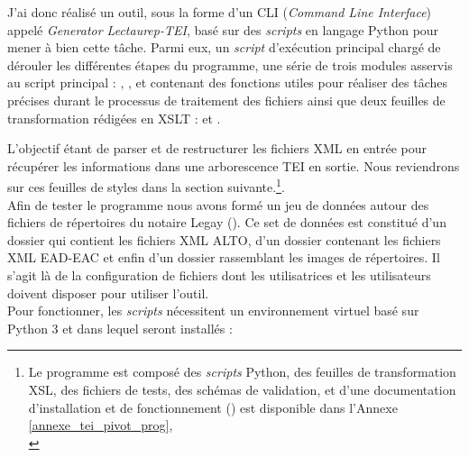 J'ai donc réalisé un outil, sous la forme d'un CLI (\textit{Command Line Interface}) appelé \textit{Generator Lectaurep-TEI}, basé sur des \textit{scripts} en langage Python pour mener à bien cette tâche. Parmi eux, un \textit{script} d'exécution principal  chargé de dérouler les différentes étapes du programme, une série de trois modules asservis au script principal : , , et  contenant des fonctions utiles pour réaliser des tâches précises durant le processus de traitement des fichiers ainsi que deux feuilles de transformation rédigées en XSLT :  et .

L'objectif étant de parser et de restructurer les fichiers XML en entrée pour récupérer les informations dans une arborescence TEI en sortie. Nous reviendrons sur ces feuilles de styles dans la section suivante.\footnote{Le programme est composé des \textit{scripts} Python, des feuilles de transformation XSL, des fichiers de tests, des schémas de validation, et d'une documentation d'installation et de fonctionnement  () est disponible dans l'Annexe \ref{annexe_tei_pivot_prog}, \\
}.\\

Afin de tester le programme nous avons formé un jeu de données autour des fichiers de répertoires du notaire Legay (). Ce set de données est constitué d'un dossier  qui contient les fichiers XML ALTO, d'un dossier  contenant les fichiers XML EAD-EAC et enfin d'un dossier  rassemblant les images de répertoires. Il s'agit là de la configuration de fichiers dont les utilisatrices et les utilisateurs doivent disposer pour utiliser l'outil.\\
\newpage
Pour fonctionner, les \textit{scripts} nécessitent un environnement virtuel basé sur Python 3 et dans lequel seront installés :

